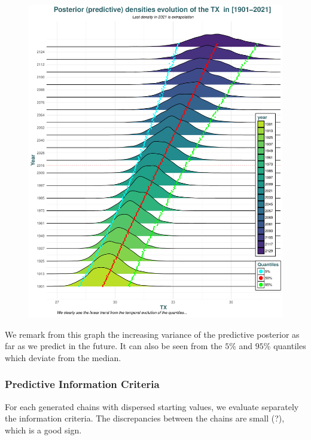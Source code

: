  \begin{figure}[!htb]
  	\centering	\includegraphics[width=0.8\linewidth]{predpred.pdf}\caption{ }\label{fig:post_pred}
 \end{figure}
  
  
  We remark from this graph the increasing variance of the predictive posterior as far as we predict in the future. It can also be seen from the $5\%$ and $95\%$ quantiles which deviate from the median. 
  


\subsubsection*{Predictive Information Criteria}

For each generated chains with dispersed starting values, we evaluate separately the information criteria. The discrepancies between the chains are small (?), which is a good sign. 




